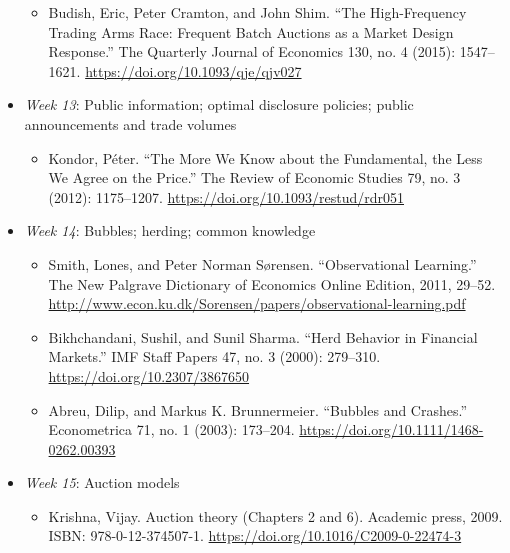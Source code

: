 \documentclass{article}
\begin{document}
\begin{itemize}
\begin{itemize}
		\item Budish, Eric, Peter Cramton, and John Shim. “The High-Frequency Trading Arms Race: Frequent Batch Auctions as a Market Design Response.” The Quarterly Journal of Economics 130, no. 4 (2015): 1547–1621. \url{https://doi.org/10.1093/qje/qjv027}
	\end{itemize}
	\item \textit{Week 13}: Public information; optimal disclosure policies; public announcements and trade volumes
	\begin{itemize}
		\item Kondor, Péter. “The More We Know about the Fundamental, the Less We Agree on the Price.” The Review of Economic Studies 79, no. 3 (2012): 1175–1207. \url{https://doi.org/10.1093/restud/rdr051}
	\end{itemize}
	\item \textit{Week 14}: Bubbles; herding; common knowledge
	\begin{itemize}
		\item Smith, Lones, and Peter Norman Sørensen. “Observational Learning.” The New Palgrave Dictionary of Economics Online Edition, 2011, 29–52. \url{http://www.econ.ku.dk/Sorensen/papers/observational-learning.pdf}
		\item Bikhchandani, Sushil, and Sunil Sharma. “Herd Behavior in Financial Markets.” IMF Staff Papers 47, no. 3 (2000): 279–310. \url{https://doi.org/10.2307/3867650}
		\item Abreu, Dilip, and Markus K. Brunnermeier. “Bubbles and Crashes.” Econometrica 71, no. 1 (2003): 173–204. \url{https://doi.org/10.1111/1468-0262.00393}
	\end{itemize}
	\item \textit{Week 15}: Auction models
	\begin{itemize}
		\item Krishna, Vijay. Auction theory (Chapters 2 and 6). Academic press, 2009. ISBN: 978-0-12-374507-1. \url{https://doi.org/10.1016/C2009-0-22474-3} 
	\end{itemize}
\end{itemize}



\end{document}
